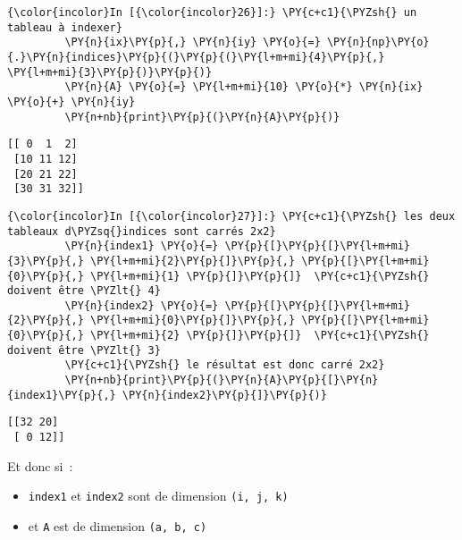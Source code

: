     \begin{Verbatim}[commandchars=\\\{\},frame=single,framerule=0.3mm,rulecolor=\color{cellframecolor}]
{\color{incolor}In [{\color{incolor}26}]:} \PY{c+c1}{\PYZsh{} un tableau à indexer}
         \PY{n}{ix}\PY{p}{,} \PY{n}{iy} \PY{o}{=} \PY{n}{np}\PY{o}{.}\PY{n}{indices}\PY{p}{(}\PY{p}{(}\PY{l+m+mi}{4}\PY{p}{,} \PY{l+m+mi}{3}\PY{p}{)}\PY{p}{)}
         \PY{n}{A} \PY{o}{=} \PY{l+m+mi}{10} \PY{o}{*} \PY{n}{ix} \PY{o}{+} \PY{n}{iy}
         \PY{n+nb}{print}\PY{p}{(}\PY{n}{A}\PY{p}{)}
\end{Verbatim}


    \begin{Verbatim}[commandchars=\\\{\},frame=single,framerule=0.3mm,rulecolor=\color{cellframecolor}]
[[ 0  1  2]
 [10 11 12]
 [20 21 22]
 [30 31 32]]
\end{Verbatim}

    \begin{Verbatim}[commandchars=\\\{\},frame=single,framerule=0.3mm,rulecolor=\color{cellframecolor}]
{\color{incolor}In [{\color{incolor}27}]:} \PY{c+c1}{\PYZsh{} les deux tableaux d\PYZsq{}indices sont carrés 2x2}
         \PY{n}{index1} \PY{o}{=} \PY{p}{[}\PY{p}{[}\PY{l+m+mi}{3}\PY{p}{,} \PY{l+m+mi}{2}\PY{p}{]}\PY{p}{,} \PY{p}{[}\PY{l+m+mi}{0}\PY{p}{,} \PY{l+m+mi}{1} \PY{p}{]}\PY{p}{]}  \PY{c+c1}{\PYZsh{} doivent être \PYZlt{} 4}
         \PY{n}{index2} \PY{o}{=} \PY{p}{[}\PY{p}{[}\PY{l+m+mi}{2}\PY{p}{,} \PY{l+m+mi}{0}\PY{p}{]}\PY{p}{,} \PY{p}{[}\PY{l+m+mi}{0}\PY{p}{,} \PY{l+m+mi}{2} \PY{p}{]}\PY{p}{]}  \PY{c+c1}{\PYZsh{} doivent être \PYZlt{} 3}
         \PY{c+c1}{\PYZsh{} le résultat est donc carré 2x2}
         \PY{n+nb}{print}\PY{p}{(}\PY{n}{A}\PY{p}{[}\PY{n}{index1}\PY{p}{,} \PY{n}{index2}\PY{p}{]}\PY{p}{)}
\end{Verbatim}


    \begin{Verbatim}[commandchars=\\\{\},frame=single,framerule=0.3mm,rulecolor=\color{cellframecolor}]
[[32 20]
 [ 0 12]]
\end{Verbatim}

    Et donc si~:

\begin{itemize}
\tightlist
\item
  \texttt{index1} et \texttt{index2} sont de dimension
  \texttt{(i,\ j,\ k)}
\item
  et \texttt{A} est de dimension \texttt{(a,\ b,\ c)}
\end{itemize}

